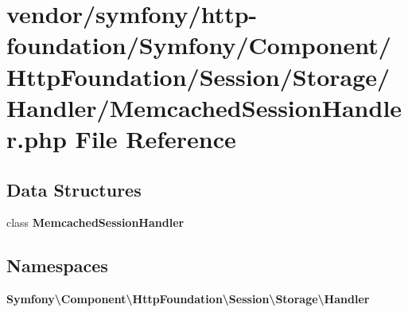 \section{vendor/symfony/http-\/foundation/\+Symfony/\+Component/\+Http\+Foundation/\+Session/\+Storage/\+Handler/\+Memcached\+Session\+Handler.php File Reference}
\label{_memcached_session_handler_8php}
\subsection*{Data Structures}
\begin{DoxyCompactItemize}
\item 
class {\bf Memcached\+Session\+Handler}
\end{DoxyCompactItemize}
\subsection*{Namespaces}
\begin{DoxyCompactItemize}
\item 
 {\bf Symfony\textbackslash{}\+Component\textbackslash{}\+Http\+Foundation\textbackslash{}\+Session\textbackslash{}\+Storage\textbackslash{}\+Handler}
\end{DoxyCompactItemize}
